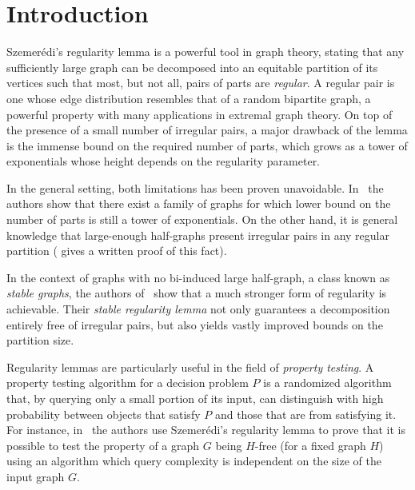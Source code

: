 \section{Introduction} \label{sec:introduction}


Szemer\'edi's regularity lemma is a powerful tool in graph theory, stating that any sufficiently large graph can be
decomposed into an equitable partition of its vertices such that most, but not all, pairs of parts are \emph{regular}.
A regular pair is one whose edge distribution resembles that of a random bipartite graph, a powerful property with many
applications in extremal graph theory.
On top of the presence of a small number of irregular pairs, a major drawback of the lemma is the immense
bound on the required number of parts, which grows as a tower of exponentials whose height depends on the regularity parameter.

In the general setting, both limitations has been proven unavoidable.
In~\cite{lower_bounds_of_tower_type_for_szeremedis_uniformity_lemma} the authors show that there exist a family of graphs
for which lower bound on the number of parts is still a tower of exponentials.
On the other hand, it is general knowledge that large-enough half-graphs present irregular pairs in any
regular partition (\cite{irregular_pairs_in_half_graphs_szemeredi_regularity} gives a written proof of this fact).

In the context of graphs with no bi-induced large half-graph, a class known as \emph{stable graphs},
the authors of~\cite{regularity_lemmas_for_stable_graphs} show that a much stronger form
of regularity is achievable.
Their \emph{stable regularity lemma} not only guarantees a decomposition entirely free of irregular pairs, but also yields
vastly improved bounds on the partition size. 

Regularity lemmas are particularly useful in the field of \emph{property testing}.
A property testing algorithm for a decision problem $P$ is a randomized algorithm that, by querying only a small portion
of its input, can distinguish with high probability between objects that satisfy $P$ and those that are  from
satisfying it.
For instance, in~\cite{efficient_testing_of_large_graphs} the authors use Szemer\'edi's regularity lemma
to prove that it is possible to test the property of a graph $G$ being $H$-free (for a fixed graph $H$) using an algorithm
which query complexity is independent on the size of the input graph $G$.

